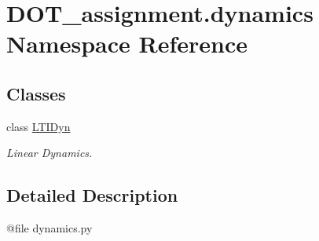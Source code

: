 \hypertarget{namespace_d_o_t__assignment_1_1dynamics}{}\section{D\+O\+T\+\_\+assignment.\+dynamics Namespace Reference}
\label{namespace_d_o_t__assignment_1_1dynamics}
\subsection*{Classes}
\begin{DoxyCompactItemize}
\item 
class \mbox{\hyperlink{class_d_o_t__assignment_1_1dynamics_1_1_l_t_i_dyn}{L\+T\+I\+Dyn}}
\begin{DoxyCompactList}\small\item\em Linear Dynamics. \end{DoxyCompactList}\end{DoxyCompactItemize}


\subsection{Detailed Description}
\begin{DoxyVerb}@file dynamics.py
\end{DoxyVerb}
 
